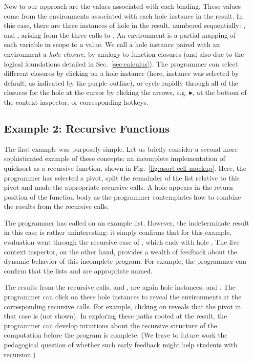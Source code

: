 New to our approach are the values associated with each binding.
These values come from the environments associated with each hole instance in the result. In this case, there are three instances of hole  in the result, numbered sequentially: ,  and , arising from the three calls to . An environment is a partial mapping of each variable in scope to a value. We call a hole instance paired with an  environment a \emph{hole closure}, by analogy to function closures (and also due to the logical foundations detailed in Sec.~\ref{sec:calculus}). The programmer can select different closures by clicking on a hole instance (here, instance  was selected by default, as indicated by the purple outline), or cycle rapidly through all of the closures for the hole at the cursor by clicking the arrows, e.g. $\blacktriangleright$, at the bottom of the context inspector, or corresponding hotkeys.

\vspace{-4px}
\subsection{Example 2: Recursive Functions}\label{sec:qsort1}\label{sec:paths}
\vspace{-2px}



The first example was purposely simple. Let us briefly consider a second more sophisticated example of these concepts: an incomplete implementation of quicksort as a recursive function, shown in Fig.~\ref{fig:qsort-cell-mockup}. Here, the programmer has selected a pivot, split the remainder of the list relative to this pivot and made the appropriate recursive calls. A hole appears in the return position of the function body as the programmer contemplates how to combine the results from the recursive calls. 

The programmer has called  on an example list. However, 
the indeterminate result in this case is rather uninteresting: it simply confirms that for this example, evaluation went through the recursive case of , which ends with hole . The live context inspector, on the other hand, provides a wealth of feedback about the dynamic behavior of this incomplete program. For example, the programmer can confirm that
the lists  and  are appropriate named.

The results from the recursive calls,  and , are again hole instances,  and . The programmer can click on these hole instances to reveal the environments at the corresponding recursive calls. For example, clicking on  reveals that the pivot in that case is  (not shown). In exploring these paths rooted at the result, the programmer can develop intuitions about the recursive structure of the computation before the program is complete. 
(We leave to future work the pedagogical question of whether such early feedback might help students with recursion.)


